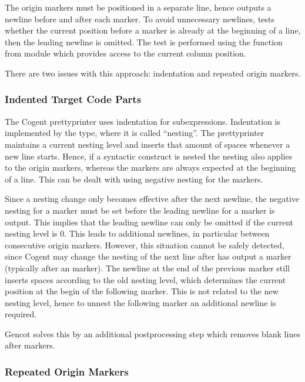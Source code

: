 The origin markers must be positioned in a separate line, hence  outputs a newline before and after
each marker. To avoid unnecessary newlines,  tests whether the current position before a marker 
is already at the beginning of a line, then the leading newline is omitted. The test is performed using the
function  from module  which provides access to the current column 
position.

There are two issues with this approach: indentation and repeated origin markers.

\subsubsection{Indented Target Code Parts}

The Cogent prettyprinter uses indentation for subexpressions. Indentation is implemented by the  type, 
where it is called ``nesting''. The prettyprinter maintains a
current nesting level and inserts that amount of spaces whenever a new line starts. Hence, if a syntactic construct
is nested the nesting also applies to the origin markers, whereas the markers are always expected at the beginning of
a line. This can be dealt with using negative nesting for the markers.

Since a nesting change only becomes effective after the next newline, the negative nesting for a marker must be set 
before the 
leading newline for a marker is output. This implies that the leading newline can only be omitted if the current
nesting level is 0. This leads to additional newlines, in particular between consecutive origin markers. However,
this situation cannot be safely detected, since Cogent may change the nesting of the next line after 
has output a marker (typically after an  marker). The newline at the end of the previous marker 
still inserts spaces according to the old nesting level, which determines the current position at the begin of
the following marker. This is not related to the new nesting level, hence to unnest the following marker an additional
newline is required.

Gencot solves this by an additional postprocessing step which removes blank lines after  markers.

\subsubsection{Repeated Origin Markers}

